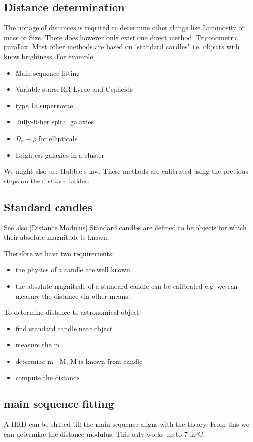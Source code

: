 \documentclass[11pt,a4paper]{article}
\begin{document}
\subsection{Distance determination}
The nonage of distances is required to determine other things like Luminosity or mass or Size. 
There does however only exist one direct method:  Trigonometric parallax. 
Most other methods are based on "standard candles" i.e. objects with know brightness. 
For example:
\begin{itemize}
    \item Main sequence fitting
    \item Variable stars: RR Lyrae and Cepheids
    \item type 1a supernovae 
    \item Tully-fisher spiral galaxies 
    \item $D_n-\rho$ for ellipticals 
    \item Brightest galaxies in a cluster
\end{itemize}
We might also use Hubble's law.
These methods are calibrated using the previous steps on the distance ladder.

\subsection{Standard candles}
See also \ref{Distance Modulus}
Standard candles are defined to be objects for which their absolute
magnitude is known.

Therefore we have two requirements:
\begin{itemize}
    \item the physics of a candle are well known 
    \item the absolute magnitude of a standard candle can be calibrated e.g. we can measure the distance via other means.
\end{itemize}
To determine distance to astronomical object:
\begin{itemize}
    \item find standard candle near object 
    \item measure the m
    \item determine m - M, M is known from candle 
    \item compute the distance
\end{itemize}
\subsection{main sequence fitting}
A HRD can be shifted till the main sequence aligns with the theory.
From this we can determine the distance modulus.
This only works up to 7 kPC. 
\end{document}
